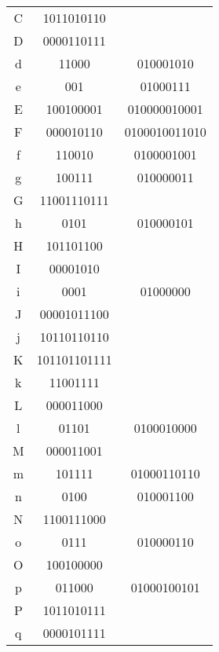 \documentclass{article}
\numberwithin{equation}{section}
\begin{document}
\begin{center}
\begin{supertabular}{ccc}
                    C  &  1011010110 &              \\
                    D  &  0000110111 &                  \\
                    d  &  11000 &   010001010           \\
                    e  &  001 &    01000111             \\
                    E  &  100100001 &  010000010001     \\
                    F  &  000010110 & 0100010011010     \\
                    f  &  110010 &     0100001001   \\
                    g  &  100111 &     010000011    \\
                    G  &  11001110111 &             \\
                    h  &  0101 &     010000101      \\
                    H  &  101101100 &               \\
                    I  &  00001010 &                \\
                    i  &  0001 &    01000000        \\
                    J  &  00001011100 &             \\
                    j  &  10110110110 &             \\
                    K  &  101101101111 &            \\
                    k  &  11001111 &                \\
                    L  &  000011000 &               \\
                    l  &  01101 &   0100010000      \\
                    M  &  000011001 &               \\
                    m  &  101111 &   01000110110    \\
                    n  &  0100 &    010001100       \\
                    N  &  1100111000 &              \\
                    o  &  0111 &    010000110       \\
                    O  &  100100000 &               \\
                    p  &  011000 &  01000100101     \\
                    P  &  1011010111 &              \\
                    q  &  0000101111 &              \\

\end{supertabular}
\end{center}
\end{document}
